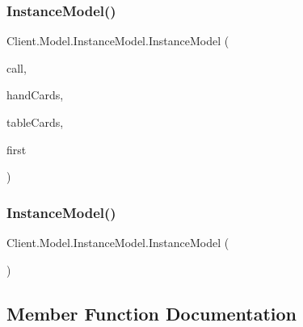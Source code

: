 \subsubsection{\texorpdfstring{Instance\+Model()}{InstanceModel()}\hspace{0.1cm}{\footnotesize\ttfamily [2/3]}}
{\footnotesize\ttfamily Client.\+Model.\+Instance\+Model.\+Instance\+Model (\begin{DoxyParamCaption}\item[{\mbox{\hyperlink{classCommon_1_1PlayerCallResponse}{Player\+Call\+Response}}}]{call,  }\item[{Hash\+Map$<$ Integer, \mbox{\hyperlink{classCommon_1_1Card}{Card}} $>$}]{hand\+Cards,  }\item[{Hash\+Map$<$ Integer, \mbox{\hyperlink{classCommon_1_1Card}{Card}} $>$}]{table\+Cards,  }\item[{\mbox{\hyperlink{classCommon_1_1Card}{Card}}}]{first }\end{DoxyParamCaption})\hspace{0.3cm}{\ttfamily [inline]}}

\mbox{\label{classClient_1_1Model_1_1InstanceModel_a5393980d2fb01dd6bc13f88cbabb77f6}} 
\subsubsection{\texorpdfstring{Instance\+Model()}{InstanceModel()}\hspace{0.1cm}{\footnotesize\ttfamily [3/3]}}
{\footnotesize\ttfamily Client.\+Model.\+Instance\+Model.\+Instance\+Model (\begin{DoxyParamCaption}{ }\end{DoxyParamCaption})\hspace{0.3cm}{\ttfamily [inline]}}



\subsection{Member Function Documentation}
\mbox{\label{classClient_1_1Model_1_1InstanceModel_a8a2f49da7c74662a49caf91450d53e3e}} 
